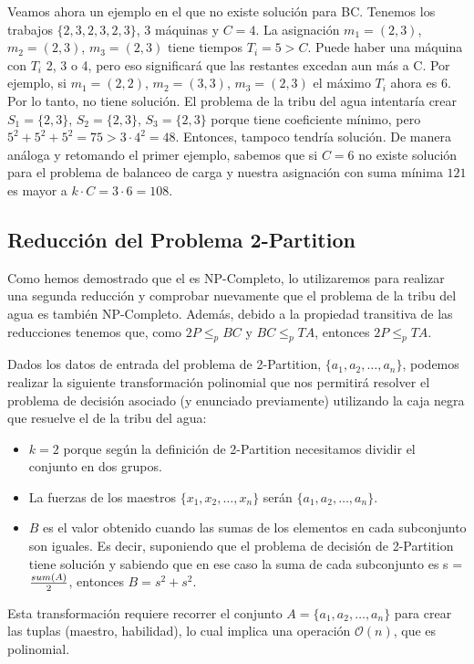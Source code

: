 \documentclass{article}
\begin{document}
Veamos ahora un ejemplo en el que no existe solución para BC. Tenemos los trabajos $\{2, 3, 2, 3, 2, 3\}$, 3 máquinas y $C = 4$. La asignación $m_1 = (2, 3)$, $m_2 = (2, 3)$, $m_3 = (2, 3)$ tiene tiempos $T_i = 5 > C$. Puede haber una máquina con $T_i$ 2, 3 o 4, pero eso significará que las restantes excedan aun más a C. Por ejemplo, si $m_1 = (2, 2)$, $m_2 = (3, 3)$, $m_3 = (2, 3)$ el máximo $T_i$ ahora es 6. Por lo tanto, no tiene solución. El problema de la tribu del agua intentaría crear $S_1 = \{2, 3\}$, $S_2 = \{2, 3\}$, $S_3 = \{2, 3\}$ porque tiene coeficiente mínimo, pero $5^2 + 5^2 + 5^2 = 75 > 3 \cdot 4^2 = 48$. Entonces, tampoco tendría solución. De manera análoga y retomando el primer ejemplo, sabemos que si $C=6$ no existe solución para el problema de balanceo de carga y nuestra asignación con suma mínima $121$ es mayor a $k \cdot C = 3 \cdot 6 = 108$.

\subsection{Reducción del Problema 2-Partition}
Como hemos demostrado que el  es NP-Completo, lo utilizaremos para realizar una segunda reducción y comprobar nuevamente que el problema de la tribu del agua es también NP-Completo. Además, debido a la propiedad transitiva de las reducciones tenemos que, como $2P \leq_p BC$ y $BC \leq_p TA$, entonces $2P \leq_p TA$.

Dados los datos de entrada del problema de 2-Partition, \( \{a_1, a_2, \ldots, a_n\} \), podemos realizar la siguiente transformación polinomial que nos permitirá resolver el problema de decisión asociado (y enunciado previamente) utilizando la caja negra que resuelve el de la tribu del agua:

\begin{itemize}
    \item \( k = 2 \) porque según la definición de 2-Partition necesitamos dividir el conjunto en dos grupos.
    \item La fuerzas de los maestros \( \{x_1, x_2, \ldots, x_n\} \) serán \( \{a_1, a_2, \ldots, a_n\} \).
    \item \( B \) es el valor obtenido cuando las sumas de los elementos en cada subconjunto son iguales. Es decir, suponiendo que el problema de decisión de 2-Partition tiene solución y sabiendo que en ese caso la suma de cada subconjunto es s = \(sum(A)\over2\), entonces $B = s^2 + s^2$. 
\end{itemize}
Esta transformación requiere recorrer el conjunto $A = \{a_1, a_2, \ldots, a_n\}$ para crear las tuplas (maestro, habilidad), lo cual implica una operación $\mathcal{O}(n)$, que es polinomial.
\end{document}
